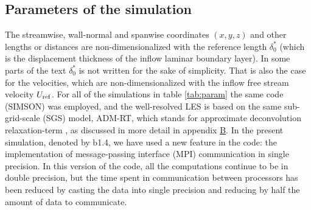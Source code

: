 \subsection{Parameters of the simulation} \label{subsec:Param_sim}
The streamwise, wall-normal and spanwise coordinates $(x,y,z)$ and other lengths or distances are non-dimensionalized with the reference length $\delta^*_0$ (which is the displacement thickness of the inflow laminar boundary layer). In some parts of the text $\delta^*_0$ is not written for the sake of simplicity. That is also the case for the velocities, which are non-dimensionalized with the inflow free stream velocity $U_{\rm ref}$.
For all of the simulations in table \ref{tab:param} the same code (SIMSON) was employed, and the well-resolved LES is based on the same sub-grid-scale (SGS) model, ADM-RT, which stands for approximate deconvolution relaxation-term \citep{Schlatter_2004}, as discussed in more detail in appendix \hyperlink{AppB}{B}. In the present simulation, denoted by b1.4, we have used a new feature in the code: the implementation of message-passing interface (MPI) communication in single precision. In this version of the code, all the computations continue to be in double precision, but the time spent in communication between processors has been reduced by casting the data into single precision and reducing by half the amount of data to communicate. 

